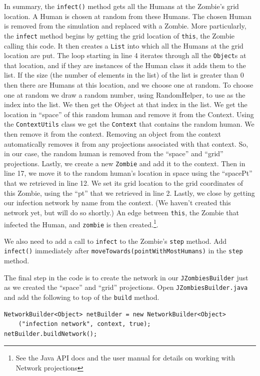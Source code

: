 \documentclass[11pt]{amsart}
\begin{document}
In summary, the \texttt{infect()} method gets all the Humans at the Zombie's grid location. A Human is chosen at random from these Humans. The chosen Human is removed from the simulation and replaced with a Zombie. More particularly, the \texttt{infect} method begins by getting the grid location of \texttt{this}, the Zombie calling this code. It then creates a \texttt{List} into which all the Humans at the grid location are put. The loop starting in line 4 iterates through all the \texttt{Object}s at that location, and if they are instances of the Human class it adds them to the list. If the size (the number of elements in the list) of the list is greater than 0 then there are Humans at this location, and we choose one at random. To choose one at random we draw a random number, using RandomHelper, to use as the index into the list. We then get the Object at that index in the list. We get the location in ``space'' of this random human and remove it from the Context. Using the \texttt{ContextUtils} class we get the \texttt{Context} that contains the random human. We then remove it from the context. Removing an object from the context automatically removes it from any projections associated with that context. So, in our case, the random human is removed from the ``space'' and ``grid'' projections. Lastly, we create a new \texttt{Zombie} and add it to the context. Then in line 17, we move it to the random human's location in space using the ``spacePt'' that we retrieved in line 12. We set its grid location to the grid coordinates of this Zombie, using the ``pt'' that we retrieved in line 2. Lastly, we close by getting our infection network by name from the context. (We haven't created this network yet, but will do so shortly.) An edge between \texttt{this}, the Zombie that infected the Human, and \texttt{zombie} is then created.\footnote{See the Java API docs and the user manual for details on working with Network projections}. 

We also need to add a call to \texttt{infect} to the Zombie's \texttt{step} method. Add \texttt{infect()} immediately after \texttt{moveTowards(pointWithMostHumans)} in the \texttt{step} method.

The final step in the code is to create the network in our \texttt{JZombiesBuilder} just as we created the ``space'' and ``grid'' projections. Open \texttt{JZombiesBuilder.java} and add the following to top of the \texttt{build} method. 

\noindent\begin{minipage}[h]{\textwidth}
\vspace{.2in}
\lstset{language=java,caption=}
\begin{lstlisting}
NetworkBuilder<Object> netBuilder = new NetworkBuilder<Object>
	("infection network", context, true);
netBuilder.buildNetwork();
\end{lstlisting}
\vspace{.2in}
\end{minipage}
\end{document}
